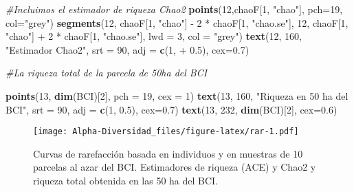 \documentclass[]{book}
\newenvironment{Shaded}{\begin{snugshade}}{\end{snugshade}}
\newcommand{\KeywordTok}[1]{\textcolor[rgb]{0.13,0.29,0.53}{\textbf{{#1}}}}
\newcommand{\DataTypeTok}[1]{\textcolor[rgb]{0.13,0.29,0.53}{{#1}}}
\newcommand{\DecValTok}[1]{\textcolor[rgb]{0.00,0.00,0.81}{{#1}}}
\newcommand{\FloatTok}[1]{\textcolor[rgb]{0.00,0.00,0.81}{{#1}}}
\newcommand{\StringTok}[1]{\textcolor[rgb]{0.31,0.60,0.02}{{#1}}}
\newcommand{\CommentTok}[1]{\textcolor[rgb]{0.56,0.35,0.01}{\textit{{#1}}}}
\newcommand{\NormalTok}[1]{{#1}}
\begin{document}
\begin{Shaded}
\begin{Highlighting}[]
\CommentTok{#Incluimos el estimador de riqueza Chao2}
\KeywordTok{points}\NormalTok{(}\DecValTok{12}\NormalTok{,chaoF[}\DecValTok{1}\NormalTok{, }\StringTok{"chao"}\NormalTok{], }\DataTypeTok{pch=}\DecValTok{19}\NormalTok{, }\DataTypeTok{col=}\StringTok{"grey"}\NormalTok{)}
\KeywordTok{segments}\NormalTok{(}\DecValTok{12}\NormalTok{, chaoF[}\DecValTok{1}\NormalTok{, }\StringTok{"chao"}\NormalTok{] -}\StringTok{ }\DecValTok{2} \NormalTok{*}\StringTok{ }\NormalTok{chaoF[}\DecValTok{1}\NormalTok{, }
                \StringTok{"chao.se"}\NormalTok{], }\DecValTok{12}\NormalTok{, chaoF[}\DecValTok{1}\NormalTok{, }\StringTok{"chao"}\NormalTok{] +}\StringTok{ }\DecValTok{2} \NormalTok{*}\StringTok{ }\NormalTok{chaoF[}\DecValTok{1}\NormalTok{,}
                \StringTok{"chao.se"}\NormalTok{], }\DataTypeTok{lwd =} \DecValTok{3}\NormalTok{, }\DataTypeTok{col =} \StringTok{"grey"}\NormalTok{) }
\KeywordTok{text}\NormalTok{(}\DecValTok{12}\NormalTok{, }\DecValTok{160}\NormalTok{, }\StringTok{"Estimador Chao2"}\NormalTok{, }\DataTypeTok{srt =} \DecValTok{90}\NormalTok{, }\DataTypeTok{adj =} \KeywordTok{c}\NormalTok{(}\DecValTok{1}\NormalTok{, +}\StringTok{ }\FloatTok{0.5}\NormalTok{), }\DataTypeTok{cex=}\FloatTok{0.7}\NormalTok{)}

\CommentTok{#La riqueza total de la parcela de 50ha del BCI}

\KeywordTok{points}\NormalTok{(}\DecValTok{13}\NormalTok{, }\KeywordTok{dim}\NormalTok{(BCI)[}\DecValTok{2}\NormalTok{], }\DataTypeTok{pch =} \DecValTok{19}\NormalTok{, }\DataTypeTok{cex =} \DecValTok{1}\NormalTok{) }
\KeywordTok{text}\NormalTok{(}\DecValTok{13}\NormalTok{, }\DecValTok{160}\NormalTok{, }\StringTok{"Riqueza  en 50 ha del BCI"}\NormalTok{,}
     \DataTypeTok{srt =} \DecValTok{90}\NormalTok{, }\DataTypeTok{adj =} \KeywordTok{c}\NormalTok{(}\DecValTok{1}\NormalTok{, }\FloatTok{0.5}\NormalTok{), }\DataTypeTok{cex=}\FloatTok{0.7}\NormalTok{)}
\KeywordTok{text}\NormalTok{(}\DecValTok{13}\NormalTok{, }\DecValTok{232}\NormalTok{, }\KeywordTok{dim}\NormalTok{(BCI)[}\DecValTok{2}\NormalTok{], }\DataTypeTok{cex=}\FloatTok{0.6}\NormalTok{)}
\end{Highlighting}
\end{Shaded}

\begin{figure}[htbp]
\centering
\texttt{[image: Alpha-Diversidad\_files/figure-latex/rar-1.pdf]}
\caption{\label{fig:rar}Curvas de rarefacción basada en individuos y en
muestras de 10 parcelas al azar del BCI. Estimadores de riqueza (ACE) y
Chao2 y riqueza total obtenida en las 50 ha del BCI.}
\end{figure}
\end{document}
